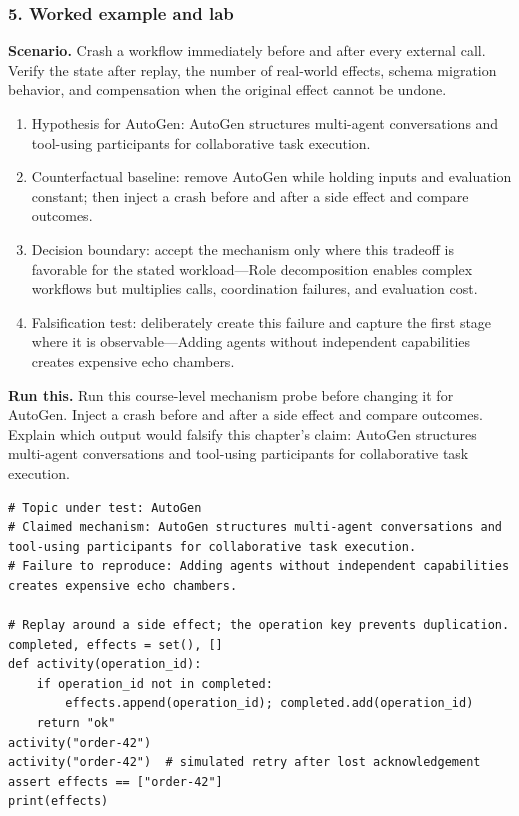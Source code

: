 \subsubsection*{5. Worked example and lab}
\textbf{Scenario.} Crash a workflow immediately before and after every external call. Verify the state after replay, the number of real-world effects, schema migration behavior, and compensation when the original effect cannot be undone.
\begin{enumerate}
\item Hypothesis for AutoGen: AutoGen structures multi-agent conversations and tool-using participants for collaborative task execution.
\item Counterfactual baseline: remove AutoGen while holding inputs and evaluation constant; then inject a crash before and after a side effect and compare outcomes.
\item Decision boundary: accept the mechanism only where this tradeoff is favorable for the stated workload—Role decomposition enables complex workflows but multiplies calls, coordination failures, and evaluation cost.
\item Falsification test: deliberately create this failure and capture the first stage where it is observable—Adding agents without independent capabilities creates expensive echo chambers.
\end{enumerate}
\textbf{Run this.} Run this course-level mechanism probe before changing it for AutoGen. Inject a crash before and after a side effect and compare outcomes. Explain which output would falsify this chapter's claim: AutoGen structures multi-agent conversations and tool-using participants for collaborative task execution.
\begin{Verbatim}[fontsize=\scriptsize]
# Topic under test: AutoGen
# Claimed mechanism: AutoGen structures multi-agent conversations and tool-using participants for collaborative task execution.
# Failure to reproduce: Adding agents without independent capabilities creates expensive echo chambers.

# Replay around a side effect; the operation key prevents duplication.
completed, effects = set(), []
def activity(operation_id):
    if operation_id not in completed:
        effects.append(operation_id); completed.add(operation_id)
    return "ok"
activity("order-42")
activity("order-42")  # simulated retry after lost acknowledgement
assert effects == ["order-42"]
print(effects)
\end{Verbatim}
